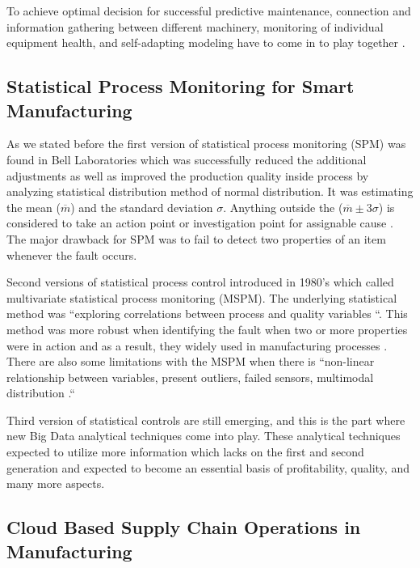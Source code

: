 \documentclass[sigconf]{acmart}
\begin{document}
\par To achieve optimal decision for successful predictive maintenance, connection and information gathering between different machinery, monitoring of individual equipment health, and self-adapting modeling have to come in to play together \cite{HE2017}. 

\subsection{Statistical Process Monitoring for Smart Manufacturing}

As we stated before the first version of statistical process monitoring (SPM) was found in Bell Laboratories which was successfully reduced the additional adjustments as well as improved the production quality inside process by analyzing statistical distribution method of normal distribution. It was estimating the mean ($\overline{m}$) and the standard deviation $\sigma $. Anything outside the ($\overline{m}\pm 3\sigma$) is considered to take an action point or investigation point for assignable cause \cite{HE2017}. The major drawback for SPM was to fail to detect two properties of an item whenever the fault occurs.


\par Second versions of statistical process control introduced in 1980's which called multivariate statistical process monitoring (MSPM). The underlying statistical method was ``exploring correlations between process and quality variables \cite{HE2017}``. This method was more robust when identifying the fault when two or more properties were in action and as a result, they widely used in manufacturing processes \cite{HE2017}. There are also some limitations with the MSPM when there is ``non-linear relationship between variables, present outliers, failed sensors, multimodal distribution \cite{HE2017}.``



\par Third version of statistical controls are still emerging, and this is the part where new Big Data analytical techniques come into play. These analytical techniques expected to utilize more information which lacks on the first and second generation and expected to become an essential basis of profitability, quality, and many more aspects.

\subsection{Cloud Based Supply Chain Operations in Manufacturing}
\end{document}
